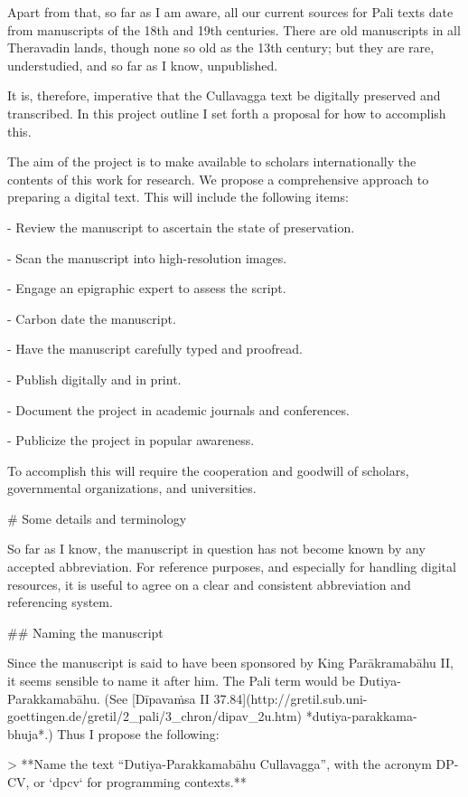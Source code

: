 \documentclass[11pt, openany,a5paper]{article}
\begin{document}
\begin{markdown}
Apart from that, so far as I am aware, all our current sources for Pali texts date from manuscripts of the 18th and 19th centuries. There are old manuscripts in all Theravadin lands, though none so old as the 13th century; but they are rare, understudied, and so far as I know, unpublished.

It is, therefore, imperative that the Cullavagga text be digitally preserved and transcribed. In this project outline I set forth a proposal for how to accomplish this.

The aim of the project is to make available to scholars internationally the contents of this work for research. We propose a comprehensive approach to preparing a digital text. This will include the following items:

- Review the manuscript to ascertain the state of preservation.

- Scan the manuscript into high-resolution images.

- Engage an epigraphic expert to assess the script.

- Carbon date the manuscript.

- Have the manuscript carefully typed and proofread.

- Publish digitally and in print.

- Document the project in academic journals and conferences.

- Publicize the project in popular awareness.

To accomplish this will require the cooperation and goodwill of scholars, governmental organizations, and universities.

# Some details and terminology

So far as I know, the manuscript in question has not become known by any accepted abbreviation. For reference purposes, and especially for handling digital resources, it is useful to agree on a clear and consistent abbreviation and referencing system.

## Naming the manuscript

Since the manuscript is said to have been sponsored by King Parākramabāhu II, it seems sensible to name it after him. The Pali term would be Dutiya-Parakkamabāhu. (See [Dīpavaṁsa II 37.84](http://gretil.sub.uni-goettingen.de/gretil/2_pali/3_chron/dipav_2u.htm) *dutiya-parakkama-bhuja*.) Thus I propose the following:

> **Name the text “Dutiya-Parakkamabāhu Cullavagga”, with the acronym DP-CV, or `dpcv` for programming contexts.**


\end{markdown}
\end{document}
